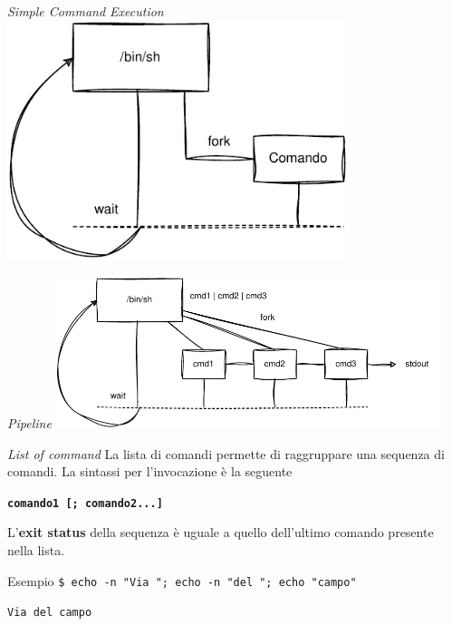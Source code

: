\documentclass{beamer}
\begin{document}
    \begin{frame}{\textit{Simple Command Execution}}
        \centering
        \includegraphics[height=7cm,keepaspectratio]{images/sce.pdf}
    \end{frame}

    \begin{frame}{\textit{Pipeline}}
        \centering
        \includegraphics[height=4.4cm,keepaspectratio]{images/pipeline.pdf}
    \end{frame}

    \begin{frame}{\textit{List of command}}
        La lista di comandi permette di raggruppare una sequenza di comandi.
        La sintassi per l'invocazione è la seguente
        \begin{center}
            \texttt{\textbf{comando1 [; comando2...]}}
        \end{center}

        L'\textbf{exit status} della sequenza è uguale a quello dell'ultimo comando
        presente nella lista.

        \vspace{1cm}

        \begin{exampleblock}{Esempio}
            \footnotesize
            \texttt{\$ echo -n "Via "; echo -n "del "; echo "campo"}
            
            \texttt{Via del campo}
        \end{exampleblock}
    \end{frame}
\end{document}
